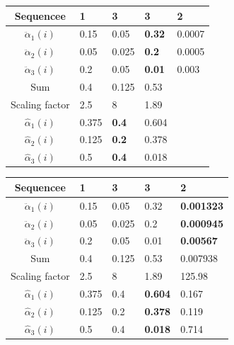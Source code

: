 \begin{frame}
\begin{table}[h]
\begin{tabular}{|c|l|l|l|l|}
 \hline
Sequencee      & 1     & 3            & 3             & 2      \\ \hline
$\ddot{\alpha}_1(i)$          & 0.15  & 0.05         & \textbf{0.32} & 0.0007 \\ \hline
$\ddot{\alpha}_2(i)$          & 0.05  & 0.025        & \textbf{0.2}  & 0.0005 \\ \hline
$\ddot{\alpha}_3(i)$          & 0.2   & 0.05         & \textbf{0.01} & 0.003  \\ \hline
Sum            & 0.4   & 0.125        & 0.53          &        \\ \hline
Scaling factor & 2.5   & 8            & 1.89          &        \\ \hline
$\hat{\alpha}_1(i)$          & 0.375 & \textbf{0.4} & 0.604         &        \\ \hline
$\hat{\alpha}_2(i)$          & 0.125 & \textbf{0.2} & 0.378         &        \\ \hline
$\hat{\alpha}_3(i)$          & 0.5   & \textbf{0.4} & 0.018         &   	   \\ \hline    
\end{tabular}
\end{table}
\end{frame}

\begin{frame}
\begin{table}[h]
\begin{tabular}{|c|l|l|l|l|}
\hline
Sequencee      & 1     & 3     & 3              & 2                 \\ \hline
$\ddot{\alpha}_1(i)$          & 0.15  & 0.05  & 0.32           & \textbf{0.001323} \\ \hline
$\ddot{\alpha}_2(i)$          & 0.05  & 0.025 & 0.2            & \textbf{0.000945} \\ \hline
$\ddot{\alpha}_3(i)$          & 0.2   & 0.05  & 0.01           & \textbf{0.00567}  \\ \hline
Sum            & 0.4   & 0.125 & 0.53           & 0.007938          \\ \hline
Scaling factor & 2.5   & 8     & 1.89           & 125.98            \\ \hline
$\hat{\alpha}_1(i)$          & 0.375 & 0.4   & \textbf{0.604} & 0.167             \\ \hline
$\hat{\alpha}_2(i)$          & 0.125 & 0.2   & \textbf{0.378} & 0.119             \\ \hline
$\hat{\alpha}_3(i)$          & 0.5   & 0.4   & \textbf{0.018} & 0.714             \\ \hline  
\end{tabular}
\end{table}
\end{frame}